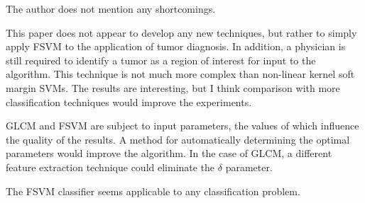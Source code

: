 \documentclass[11pt]{article}
\begin{document}
\begin{description}[leftmargin=0in]
    \item [Shortcomings] The author does not mention any shortcomings.

    \item [Self Evaluation] This paper does not appear to develop any new
        techniques, but rather to simply apply FSVM to the application of tumor
        diagnosis. In addition, a physician is still required to identify a
        tumor as a region of interest for input to the algorithm. This technique
        is not much more complex than non-linear kernel soft margin SVMs. The
        results are interesting, but I think comparison with more classification
        techniques would improve the experiments.

    \item [Improvements] GLCM and FSVM are subject to input parameters, the
        values of which influence the quality of the results. A method for
        automatically determining the optimal parameters would improve the
        algorithm. In the case of GLCM, a different feature extraction technique
        could eliminate the $\delta$ parameter.

    \item [Applications] The FSVM classifier seems applicable to any
        classification problem.

    \item [Packages]
\end{description}

 
\end{document}
